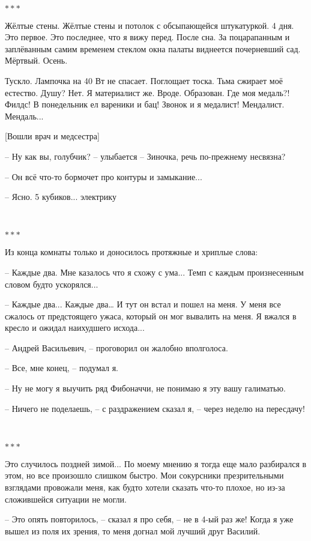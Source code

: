 \
\begin{center}\( *** \)\end{center}
Жёлтые стены. Жёлтые стены и потолок с обсыпающейся штукатуркой. 4 дня. Это первое. Это последнее, что я вижу перед. После сна. За поцарапанным и заплёванным самим временем стеклом окна палаты виднеется почерневший сад. Мёртвый. Осень.

Тускло. Лампочка на 40 Вт не спасает. Поглощает тоска. Тьма сжирает моё естество. Душу? Нет. Я материалист же. Вроде. Образован. Где моя медаль?! Филдс! В понедельник ел вареники и бац! Звонок и я медалист! Мендалист. Мендаль...

[Вошли врач и медсестра]

-- Ну как вы, голубчик? -- улыбается -- Зиночка, речь по-прежнему несвязна?

-- Он всё что-то бормочет про контуры и замыкание...

-- Ясно. 5 кубиков... электрику

\
\begin{center}\( *** \)\end{center}
Из конца комнаты только и доносилось протяжные и хриплые слова:

-- Каждые два.
Мне казалось что я схожу с ума... Темп с каждым произнесенным словом будто ускорялся...

-- Каждые два... Каждые два…
И тут он встал и пошел на меня. У меня все сжалось от предстоящего ужаса, который он мог вывалить на меня. Я вжался в кресло и ожидал наихудшего исхода...

-- Андрей Васильевич, -- проговорил он жалобно вполголоса.

-- Все, мне конец, -- подумал я.

-- Ну не могу я выучить ряд Фибоначчи, не понимаю я эту вашу галиматью.

-- Ничего не поделаешь, -- с раздражением сказал я, -- через неделю на пересдачу!

\
\begin{center}\( *** \)\end{center}
Это случилось поздней зимой... По моему мнению я тогда еще мало разбирался в этом, но все произошло слишком быстро. Мои сокурсники презрительными взглядами провожали меня, как будто хотели сказать что-то плохое, но из-за сложившейся ситуации не могли.

-- Это опять повторилось, -- сказал я про себя, -- не в 4-ый раз же!
Когда я уже вышел из поля их зрения, то меня догнал мой лучший друг Василий.

